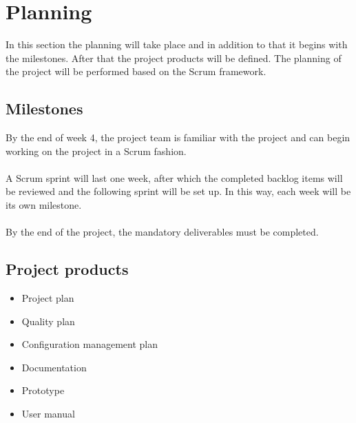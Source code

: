 \section{Planning}
In this section the planning will take place and in addition to that it begins with the milestones.
After that the project products will be defined. The planning of the project will be performed based on the Scrum framework.

    \subsection{Milestones}
    By the end of week 4, the project team is familiar with the project and can begin working on the project in a Scrum fashion.\\\\
    A Scrum sprint will last one week, after which the completed backlog items will be reviewed and the following sprint will be set up. In this way, each week will be its own milestone.\\\\
    By the end of the project, the mandatory deliverables must be completed.
    
    \subsection{Project products}\label{sec:products}
    \begin{itemize}
        \item Project plan
        \item Quality plan
        \item Configuration management plan
        \item Documentation
        \item Prototype
        \item User manual
    \end{itemize}